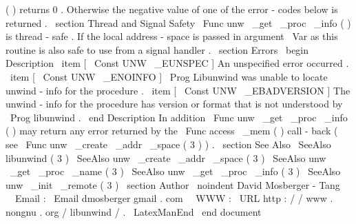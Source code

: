 (
)
returns
0
.
Otherwise
the
negative
value
of
one
of
the
error
-
codes
below
is
returned
.
\
section
{
Thread
and
Signal
Safety
}
\
Func
{
unw
\
_get
\
_proc
\
_info
}
(
)
is
thread
-
safe
.
If
the
local
address
-
space
is
passed
in
argument
\
Var
{
as
}
this
routine
is
also
safe
to
use
from
a
signal
handler
.
\
section
{
Errors
}
\
begin
{
Description
}
\
item
[
\
Const
{
UNW
\
_EUNSPEC
}
]
An
unspecified
error
occurred
.
\
item
[
\
Const
{
UNW
\
_ENOINFO
}
]
\
Prog
{
Libunwind
}
was
unable
to
locate
unwind
-
info
for
the
procedure
.
\
item
[
\
Const
{
UNW
\
_EBADVERSION
}
]
The
unwind
-
info
for
the
procedure
has
version
or
format
that
is
not
understood
by
\
Prog
{
libunwind
}
.
\
end
{
Description
}
In
addition
\
Func
{
unw
\
_get
\
_proc
\
_info
}
(
)
may
return
any
error
returned
by
the
\
Func
{
access
\
_mem
}
(
)
call
-
back
(
see
\
Func
{
unw
\
_create
\
_addr
\
_space
}
(
3
)
)
.
\
section
{
See
Also
}
\
SeeAlso
{
libunwind
(
3
)
}
\
SeeAlso
{
unw
\
_create
\
_addr
\
_space
(
3
)
}
\
SeeAlso
{
unw
\
_get
\
_proc
\
_name
(
3
)
}
\
SeeAlso
{
unw
\
_get
\
_proc
\
_info
(
3
)
}
\
SeeAlso
{
unw
\
_init
\
_remote
(
3
)
}
\
section
{
Author
}
\
noindent
David
Mosberger
-
Tang
\
\
Email
:
\
Email
{
dmosberger
gmail
.
com
}
\
\
WWW
:
\
URL
{
http
:
/
/
www
.
nongnu
.
org
/
libunwind
/
}
.
\
LatexManEnd
\
end
{
document
}
